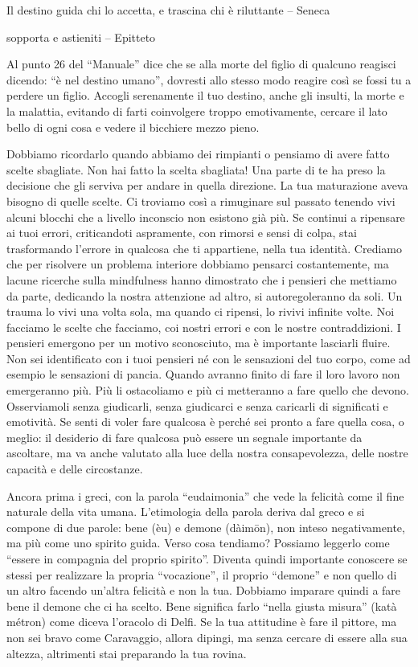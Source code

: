\documentclass[12pt]{book} %
\begin{document}
Il destino guida chi lo accetta, e trascina chi è riluttante – Seneca

sopporta e astieniti – Epitteto

Al punto 26 del “Manuale” dice che se alla morte del figlio di qualcuno reagisci
dicendo: “è nel destino umano”, dovresti allo stesso modo reagire così se fossi tu a perdere un figlio. Accogli
serenamente il tuo destino, anche gli insulti, la morte e la malattia, evitando di farti coinvolgere troppo emotivamente,
cercare il lato bello di ogni cosa e vedere il bicchiere mezzo pieno.

Dobbiamo ricordarlo quando abbiamo dei rimpianti o pensiamo di avere fatto scelte sbagliate. Non hai fatto la scelta
sbagliata! Una parte di te ha preso la decisione che gli serviva per andare in quella direzione. La tua maturazione
aveva bisogno di quelle scelte. Ci troviamo così a rimuginare sul passato tenendo vivi alcuni blocchi che a livello
inconscio non esistono già più. Se continui a ripensare ai tuoi errori, criticandoti aspramente, con rimorsi e sensi di
colpa, stai trasformando l'errore in qualcosa che ti appartiene, nella tua identità.
Crediamo che per risolvere un problema interiore dobbiamo pensarci costantemente, ma lacune ricerche sulla mindfulness hanno dimostrato che i pensieri che mettiamo da parte, dedicando la nostra attenzione ad altro, si autoregoleranno da soli.
Un trauma lo vivi una volta sola, ma quando ci ripensi, lo rivivi infinite volte. Noi facciamo le scelte che facciamo, coi
nostri errori e con le nostre contraddizioni. I pensieri emergono per un motivo sconosciuto, ma è importante lasciarli
fluire. Non sei identificato con i tuoi pensieri né con le sensazioni del tuo corpo, come ad esempio le sensazioni di
pancia. Quando avranno finito di fare il loro lavoro non emergeranno più. Più li ostacoliamo e più ci metteranno a fare
quello che devono. Osserviamoli senza giudicarli, senza giudicarci e senza caricarli di significati e emotività. 
Se senti di voler fare qualcosa è perché sei pronto a fare quella cosa, o meglio: il desiderio di fare qualcosa può essere un segnale importante da ascoltare, ma va anche valutato alla luce della nostra consapevolezza, delle nostre capacità e delle circostanze.

Ancora prima i greci, con la parola “eudaimonia” che vede la felicità come il fine naturale della vita umana.
L'etimologia della parola deriva dal greco e si compone di due parole: bene (èu) e demone
(dàimōn), non inteso negativamente, ma più come uno spirito guida. Verso cosa tendiamo? Possiamo leggerlo come “essere
in compagnia del proprio spirito”. Diventa quindi importante conoscere se stessi per realizzare la propria “vocazione”,
il proprio “demone” e non quello di un altro facendo un'altra felicità e non la tua. Dobbiamo
imparare quindi a fare bene il demone che ci ha scelto. Bene significa farlo “nella giusta misura” (katà métron) come
diceva l'oracolo di Delfi. Se la tua attitudine è fare il pittore, ma non sei bravo come
Caravaggio, allora dipingi, ma senza cercare di essere alla sua altezza, altrimenti stai preparando la tua rovina.
\end{document}
